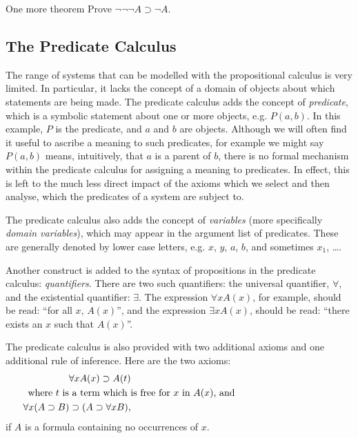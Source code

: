 \begin{exercise}{One more theorem}%
Prove
$\neg\neg\neg A \supset \neg A$.
\end{exercise}

\subsection{The Predicate Calculus}\label{predicatesec}

The range of systems that can be modelled with the propositional calculus is
very limited. In particular, it lacks the concept of a domain of objects about which
statements are being made. The predicate calculus \cite{Mendelson64} adds the concept of {\em predicate},
which is a symbolic statement about one or more objects, e.g. $P(a,b)$. In this example,
$P$ is the predicate, and $a$ and $b$ are objects. Although we will often find it useful
to ascribe a meaning to such predicates, for example we might say $P(a,b)$ means, intuitively,
that $a$ is a parent of $b$, there is no formal mechanism within the predicate calculus
for assigning a meaning to predicates. In effect, this is left to the much less direct
impact of the axioms which we select and then analyse, which the predicates of a system
are subject to.

The predicate calculus also adds the concept of {\em variables} (more specifically {\em domain
variables}), which may appear in the argument list of predicates. These are generally denoted
by lower case letters, e.g. $x$, $y$, $a$, $b$, and sometimes $x_1$, \dots.

Another construct is added to the syntax of propositions in the predicate calculus: {\em quantifiers}.
There are two such quantifiers: the universal quantifier, $\forall$, and the existential quantifier: $\exists$.
The expression $\forall x A(x)$, for example, should be read: ``for all $x$, $A(x)$'', and the expression
$\exists x A(x)$, should be read: ``there exists an $x$ such that $A(x)$''.

The predicate calculus is also provided with two additional axioms and one additional rule
of inference. Here are the two axioms:
\begin{eqnarray}\label{specialization}
		&&\forall x A(x) \supset A(t) \\ 
\noalign{where $t$ is a term which is free for $x$ in $A(x)$, and} \label{slipthrough}
&&\forall x(A \supset B) \supset (A \supset \forall xB),
\end{eqnarray}
if $A$ is a formula containing no occurrences of $x$.

